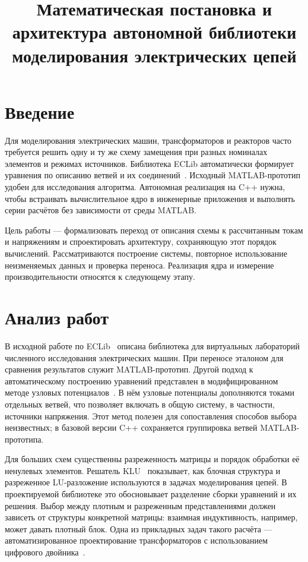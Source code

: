\documentclass{misisarticle}
\title{Математическая постановка и архитектура автономной библиотеки моделирования электрических цепей}
\begin{document}
\maketitle

\section{Введение}

Для моделирования электрических машин, трансформаторов и реакторов часто требуется решить одну и ту же схему замещения при разных номиналах элементов и режимах источников. Библиотека ECLib автоматически формирует уравнения по описанию ветвей и их соединений~\cite{eclib2016}. Исходный MATLAB-прототип удобен для исследования алгоритма. Автономная реализация на C++ нужна, чтобы встраивать вычислительное ядро в инженерные приложения и выполнять серии расчётов без зависимости от среды MATLAB.

Цель работы --- формализовать переход от описания схемы к рассчитанным токам и напряжениям и спроектировать архитектуру, сохраняющую этот порядок вычислений. Рассматриваются построение системы, повторное использование неизменяемых данных и проверка переноса. Реализация ядра и измерение производительности относятся к следующему этапу.

\section{Анализ работ}

В исходной работе по ECLib~\cite{eclib2016} описана библиотека для виртуальных лабораторий численного исследования электрических машин. При переносе эталоном для сравнения результатов служит MATLAB-прототип. Другой подход к автоматическому построению уравнений представлен в модифицированном методе узловых потенциалов~\cite{ho1975}. В нём узловые потенциалы дополняются токами отдельных ветвей, что позволяет включать в общую систему, в частности, источники напряжения. Этот метод полезен для сопоставления способов выбора неизвестных; в базовой версии C++ сохраняется группировка ветвей MATLAB-прототипа.

Для больших схем существенны разреженность матрицы и порядок обработки её ненулевых элементов. Решатель KLU~\cite{klu2010} показывает, как блочная структура и разреженное LU-разложение используются в задачах моделирования цепей. В проектируемой библиотеке это обосновывает разделение сборки уравнений и их решения. Выбор между плотным и разреженным представлениями должен зависеть от структуры конкретной матрицы: взаимная индуктивность, например, может давать плотный блок. Одна из прикладных задач такого расчёта --- автоматизированное проектирование трансформаторов с использованием цифрового двойника~\cite{stulov2023}.
\end{document}
